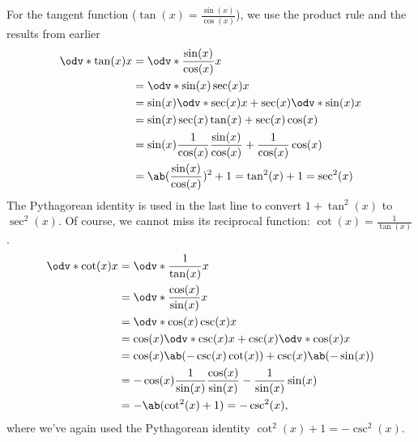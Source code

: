 For the tangent function ($\tan(x) = \frac{\sin(x)}{\cos(x)}$), we use the product rule and the results from earlier
\begin{align}
	\odv*{\tan(x)}{x} & = \odv*{\frac{\sin(x)}{\cos(x)}}{x}                                          \\
	                  & = \odv*{\sin(x)\sec(x)}{x}                                                   \\
	                  & = \sin(x)\odv*{\sec(x)}{x} + \sec(x)\odv*{\sin(x)}{x}                        \\
	                  & = \sin(x)\sec(x)\tan(x) + \sec(x)\cos(x)                                     \\
	                  & = \sin(x)\frac{1}{\cos(x)}\frac{\sin(x)}{\cos(x)} + \frac{1}{\cos(x)}\cos(x) \\
	                  & = \ab(\frac{\sin(x)}{\cos(x)})^2 + 1 = \tan^2(x) + 1 = \sec^2(x)
\end{align}
The Pythagorean identity is used in the last line to convert $1 + \tan^2(x)$ to $\sec^2(x)$. Of course, we cannot miss its reciprocal function: $\cot(x) = \frac{1}{\tan(x)}$.
\begin{align}
	\odv*{\cot(x)}{x} & = \odv*{\frac{1}{\tan(x)}}{x}                                                 \\
	                  & = \odv*{\frac{\cos(x)}{\sin(x)}}{x}                                           \\
	                  & = \odv*{\cos(x)\csc(x)}{x}                                                    \\
	                  & = \cos(x)\odv*{\csc(x)}{x} + \csc(x)\odv*{\cos(x)}{x}                         \\
	                  & = \cos(x)\ab(-\csc(x)\cot(x)) + \csc(x)\ab(-\sin(x))                          \\
	                  & = -\cos(x)\frac{1}{\sin(x)}\frac{\cos(x)}{\sin(x)} - \frac{1}{\sin(x)}\sin(x) \\
	                  & = -\ab(\cot^2(x) + 1) = -\csc^2(x),
\end{align}
where we've again used the Pythagorean identity $\cot^2(x) + 1 = -\csc^2(x)$.

